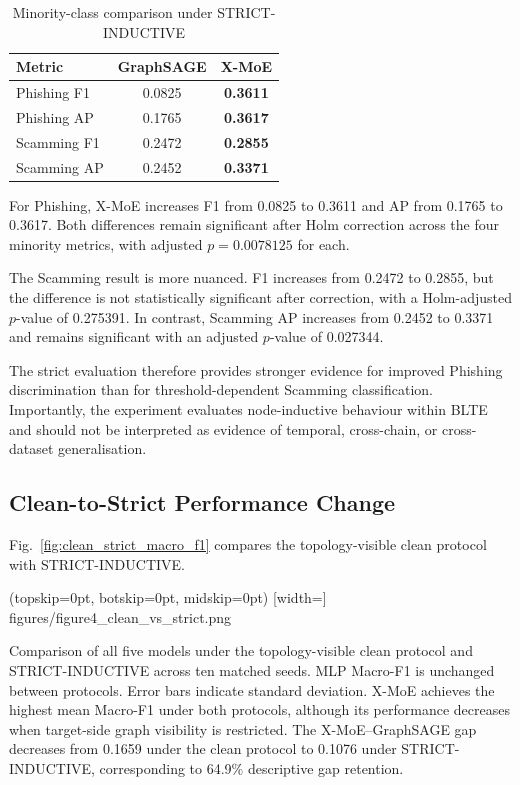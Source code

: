 \documentclass{ieeeaccess}
\begin{document}
\begin{table}[t]
\centering
\caption{Minority-class comparison under STRICT-INDUCTIVE}
\label{tab:strict_minority_results}

\renewcommand{\arraystretch}{1.12}
\setlength{\tabcolsep}{4pt}
\scriptsize

\begin{tabular}{lcc}
\toprule
\textbf{Metric} &
\textbf{GraphSAGE} &
\textbf{X-MoE} \\
\midrule

Phishing F1 &
0.0825 &
\textbf{0.3611} \\

Phishing AP &
0.1765 &
\textbf{0.3617} \\

Scamming F1 &
0.2472 &
\textbf{0.2855} \\

Scamming AP &
0.2452 &
\textbf{0.3371} \\

\bottomrule
\end{tabular}
\end{table}

For Phishing, X-MoE increases F1 from 0.0825 to 0.3611 and AP from 0.1765 to 0.3617. Both differences remain significant after Holm correction across the four minority metrics, with adjusted \(p=0.0078125\) for each.

The Scamming result is more nuanced. F1 increases from 0.2472 to 0.2855, but the difference is not statistically significant after correction, with a Holm-adjusted \(p\)-value of 0.275391. In contrast, Scamming AP increases from 0.2452 to 0.3371 and remains significant with an adjusted \(p\)-value of 0.027344.

The strict evaluation therefore provides stronger evidence for improved Phishing discrimination than for threshold-dependent Scamming classification. Importantly, the experiment evaluates node-inductive behaviour within BLTE and should not be interpreted as evidence of temporal, cross-chain, or cross-dataset generalisation.


\subsection{Clean-to-Strict Performance Change}

Fig.~\ref{fig:clean_strict_macro_f1} compares the topology-visible clean protocol with STRICT-INDUCTIVE.

\Figure[t!](topskip=0pt, botskip=0pt, midskip=0pt)
[width=\textwidth]
{figures/figure4_clean_vs_strict.png}
{\parbox[t]{0.82\textwidth}{\raggedright
Comparison of all five models under the topology-visible clean protocol and STRICT-INDUCTIVE across ten matched seeds. MLP Macro-F1 is unchanged between protocols. Error bars indicate standard deviation. X-MoE achieves the highest mean Macro-F1 under both protocols, although its performance decreases when target-side graph visibility is restricted. The X-MoE--GraphSAGE gap decreases from 0.1659 under the clean protocol to 0.1076 under STRICT-INDUCTIVE, corresponding to 64.9\% descriptive gap retention.}
\label{fig:clean_strict_macro_f1}}
\end{document}
